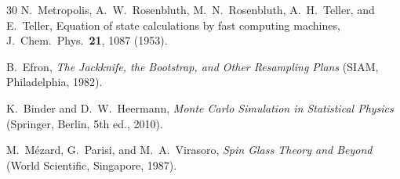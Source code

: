\documentclass[aps, pre, reprint, amsmath, amssymb, superscriptaddress, floatfix]{revtex4-2}
\begin{document}
\begin{thebibliography}{30}
N.~Metropolis, A.~W.~Rosenbluth, M.~N.~Rosenbluth, A.~H.~Teller,
and E.~Teller,
Equation of state calculations by fast computing machines,
J.~Chem.~Phys.\ \textbf{21}, 1087 (1953).

B.~Efron,
\textit{The Jackknife, the Bootstrap, and Other Resampling Plans}
(SIAM, Philadelphia, 1982).

K.~Binder and D.~W.~Heermann,
\textit{Monte Carlo Simulation in Statistical Physics}
(Springer, Berlin, 5th ed., 2010).

M.~M\'ezard, G.~Parisi, and M.~A.~Virasoro,
\textit{Spin Glass Theory and Beyond}
(World Scientific, Singapore, 1987).

\end{thebibliography}
\end{document}

